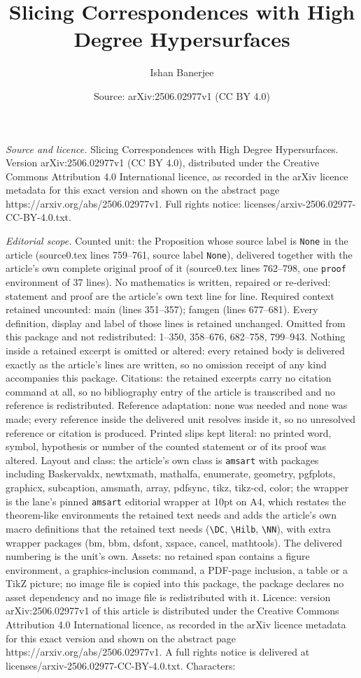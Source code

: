 \documentclass[10pt,a4paper]{amsart}
\title[Slicing Correspondences with High Degree Hypersurfaces]{Slicing Correspondences with High Degree Hypersurfaces}
\author{Ishan Banerjee}
\date{Source: arXiv:2506.02977v1 (CC BY 4.0)}
\begin{document}
\maketitle

\noindent\emph{Source and licence.} Slicing Correspondences with High Degree Hypersurfaces. Version arXiv:2506.02977v1 (CC BY 4.0), distributed under the Creative Commons Attribution 4.0 International licence, as recorded in the arXiv licence metadata for this exact version and shown on the abstract page https://arxiv.org/abs/2506.02977v1. Full rights notice: licenses/arxiv-2506.02977-CC-BY-4.0.txt.\par\smallskip

\noindent\textit{Editorial scope.} Counted unit: the Proposition whose source label is \texttt{None} in the article (source0.tex lines 759--761, source label \texttt{None}), delivered together with the article's own complete original proof of it (source0.tex lines 762--798, one \texttt{proof} environment of 37 lines). No mathematics is written, repaired or re-derived: statement and proof are the article's own text line for line. Required context retained uncounted: main (lines 351--357); famgen (lines 677--681). Every definition, display and label of those lines is retained unchanged. Omitted from this package and not redistributed: 1--350, 358--676, 682--758, 799--943. Nothing inside a retained excerpt is omitted or altered: every retained body is delivered exactly as the article's lines are written, so no omission receipt of any kind accompanies this package. Citations: the retained excerpts carry no citation command at all, so no bibliography entry of the article is transcribed and no reference is redistributed. Reference adaptation: none was needed and none was made; every reference inside the delivered unit resolves inside it, so no unresolved reference or citation is produced. Printed slips kept literal: no printed word, symbol, hypothesis or number of the counted statement or of its proof was altered. Layout and class: the article's own class is \texttt{amsart} with packages including Baskervaldx, newtxmath, mathalfa, enumerate, geometry, pgfplots, graphicx, subcaption, amsmath, array, pdfsync, tikz, tikz-cd, color; the wrapper is the lane's pinned \texttt{amsart} editorial wrapper at 10pt on A4, which restates the theorem-like environments the retained text needs and adds the article's own macro definitions that the retained text needs (\texttt{\textbackslash DC}, \texttt{\textbackslash Hilb}, \texttt{\textbackslash NN}), with extra wrapper packages (bm, bbm, dsfont, xspace, cancel, mathtools). The delivered numbering is the unit's own. Assets: no retained span contains a figure environment, a graphics-inclusion command, a PDF-page inclusion, a table or a TikZ picture; no image file is copied into this package, the package declares no asset dependency and no image file is redistributed with it. Licence: version arXiv:2506.02977v1 of this article is distributed under the Creative Commons Attribution 4.0 International licence, as recorded in the arXiv licence metadata for this exact version and shown on the abstract page https://arxiv.org/abs/2506.02977v1. A full rights notice is delivered at licenses/arxiv-2506.02977-CC-BY-4.0.txt. Characters: 
\end{document}

